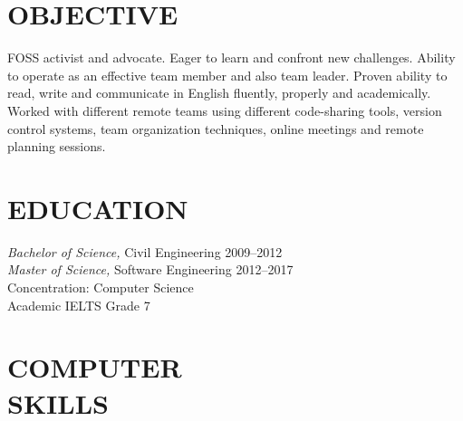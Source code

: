 \documentclass[margin, 10pt]{res} %
\begin{document}
\begin{resume}


\section{OBJECTIVE}
FOSS activist and advocate. Eager to learn and confront new challenges.
Ability to operate as an effective team member and also team leader.
Proven ability to read, write and communicate in English fluently, properly and academically.
Worked with different remote teams  using different code-sharing tools,
version control systems, team organization techniques, online meetings and remote
planning sessions.

\section{EDUCATION}

{\sl Bachelor of Science,} Civil Engineering 2009--2012 \\
{\sl Master of Science,} Software Engineering 2012--2017 \\
Concentration: Computer Science \\
Academic IELTS Grade 7

\section{COMPUTER \\ SKILLS}


\end{resume}
\end{document}
